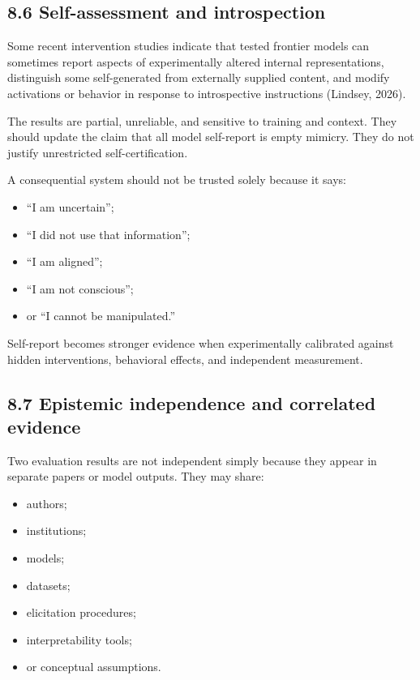\documentclass[
  11pt,
]{article}
\providecommand{\tightlist}{%
  \setlength{\itemsep}{0pt}\setlength{\parskip}{0pt}}
\begin{document}
\subsection{8.6 Self-assessment and
introspection}\label{self-assessment-and-introspection}

Some recent intervention studies indicate that tested frontier models
can sometimes report aspects of experimentally altered internal
representations, distinguish some self-generated from externally
supplied content, and modify activations or behavior in response to
introspective instructions (Lindsey, 2026).

The results are partial, unreliable, and sensitive to training and
context. They should update the claim that all model self-report is
empty mimicry. They do not justify unrestricted self-certification.

A consequential system should not be trusted solely because it says:

\begin{itemize}
\tightlist
\item
  ``I am uncertain'';
\item
  ``I did not use that information'';
\item
  ``I am aligned'';
\item
  ``I am not conscious'';
\item
  or ``I cannot be manipulated.''
\end{itemize}

Self-report becomes stronger evidence when experimentally calibrated
against hidden interventions, behavioral effects, and independent
measurement.

\subsection{8.7 Epistemic independence and correlated
evidence}\label{epistemic-independence-and-correlated-evidence}

Two evaluation results are not independent simply because they appear in
separate papers or model outputs. They may share:

\begin{itemize}
\tightlist
\item
  authors;
\item
  institutions;
\item
  models;
\item
  datasets;
\item
  elicitation procedures;
\item
  interpretability tools;
\item
  or conceptual assumptions.
\end{itemize}
\end{document}
